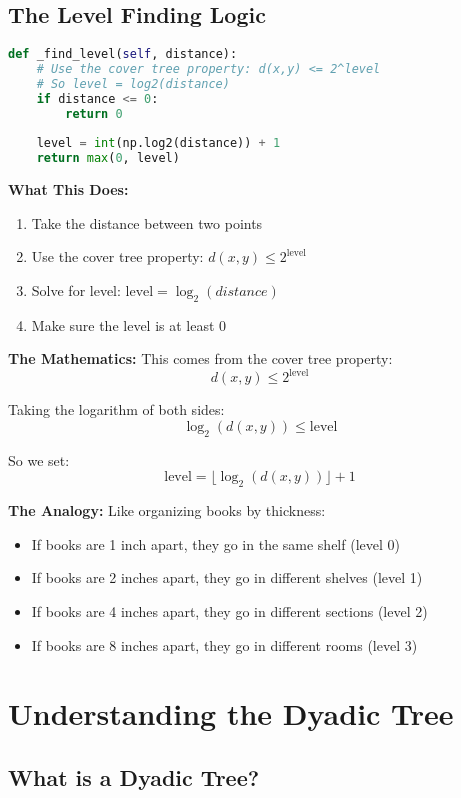 \documentclass[12pt]{article}
\begin{document}
\subsection{The Level Finding Logic}

\begin{lstlisting}[language=Python, basicstyle=\small]
def _find_level(self, distance):
    # Use the cover tree property: d(x,y) <= 2^level
    # So level = log2(distance)
    if distance <= 0:
        return 0
    
    level = int(np.log2(distance)) + 1
    return max(0, level)
\end{lstlisting}

\textbf{What This Does:}
\begin{enumerate}
    \item Take the distance between two points
    \item Use the cover tree property: $d(x,y) \leq 2^{\text{level}}$
    \item Solve for level: $\text{level} = \log_2(distance)$
    \item Make sure the level is at least 0
\end{enumerate}

\textbf{The Mathematics:} This comes from the cover tree property:
$$d(x,y) \leq 2^{\text{level}}$$

Taking the logarithm of both sides:
$$\log_2(d(x,y)) \leq \text{level}$$

So we set:
$$\text{level} = \lfloor \log_2(d(x,y)) \rfloor + 1$$

\textbf{The Analogy:} Like organizing books by thickness:
\begin{itemize}
    \item If books are 1 inch apart, they go in the same shelf (level 0)
    \item If books are 2 inches apart, they go in different shelves (level 1)
    \item If books are 4 inches apart, they go in different sections (level 2)
    \item If books are 8 inches apart, they go in different rooms (level 3)
\end{itemize}

\section{Understanding the Dyadic Tree}

\subsection{What is a Dyadic Tree?}
\end{document}
